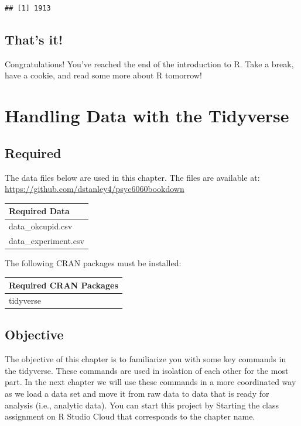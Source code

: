 \documentclass[
]{krantz}
\begin{document}
\begin{verbatim}
## [1] 1913
\end{verbatim}

\hypertarget{thats-it}{%
\section{That's it!}\label{thats-it}}

Congratulations! You've reached the end of the introduction to R. Take a break, have a cookie, and read some more about R tomorrow!

\hypertarget{handling-data-with-the-tidyverse}{%
\chapter{Handling Data with the Tidyverse}\label{handling-data-with-the-tidyverse}}

\hypertarget{required}{%
\section{Required}\label{required}}

The data files below are used in this chapter. The files are available at: \url{https://github.com/dstanley4/psyc6060bookdown}

\begin{longtable}[]{@{}l@{}}
\toprule
Required Data\tabularnewline
\midrule
\endhead
data\_okcupid.csv\tabularnewline
data\_experiment.csv\tabularnewline
\bottomrule
\end{longtable}

The following CRAN packages must be installed:

\begin{longtable}[]{@{}l@{}}
\toprule
Required CRAN Packages\tabularnewline
\midrule
\endhead
tidyverse\tabularnewline
\bottomrule
\end{longtable}

\hypertarget{objective}{%
\section{Objective}\label{objective}}

The objective of this chapter is to familiarize you with some key commands in the tidyverse. These commands are used in isolation of each other for the most part. In the next chapter we will use these commands in a more coordinated way as we load a data set and move it from raw data to data that is ready for analysis (i.e., analytic data). You can start this project by Starting the class assignment on R Studio Cloud that corresponds to the chapter name.
\end{document}

